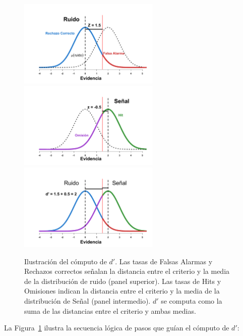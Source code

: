\begin{itemize}
\begin{figure}[th]
\centering
\includegraphics[width=0.60\textwidth]{Figures/dR_1}\\ 
\includegraphics[width=0.60\textwidth]{Figures/dR_2}\\
\includegraphics[width=0.60\textwidth]{Figures/dR_3}\\ 
\caption[Estimación paramétrica: la discriminabilidad ($d'$)]{Ilustración del cómputo de $d'$. Las tasas de Falsas Alarmas y Rechazos correctos señalan la distancia entre el criterio y la media de la distribución de ruido (panel superior). Las tasas de Hits y Omisiones indican la distancia entre el criterio y la media de la distribución de Señal (panel intermedio). $d'$ se computa como la suma de las distancias entre el criterio y ambas medias.}
\label{fig:Graf_Discrim}
\end{figure}

La Figura~\ref{fig:Graf_Discrim} ilustra la secuencia lógica de pasos que guían el cómputo de $d'$:\\


\end{itemize}

